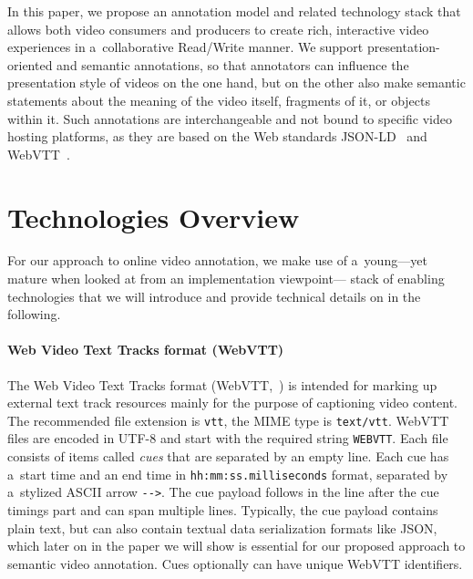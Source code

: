 \documentclass{sig-alternate}
\def\JSONLD{\mbox{JSON-LD}}
\begin{document}
In this paper, we propose an annotation model
and related technology stack that allows both
video consumers and producers to create
rich, interactive video experiences
in a~collaborative Read/Write manner.
We support presentation-oriented and semantic annotations,
so that annotators can influence
the presentation style of videos on the one hand,
but on the other also make semantic statements
about the meaning of the video itself, fragments of it,
or objects within it.
Such annotations are interchangeable
and not bound to specific video hosting platforms,
as they are based on the Web standards
\JSONLD~\cite{sporny2013jsonld}
and WebVTT~\cite{pfeiffer2013webvtt}.

\section{Technologies Overview}

For our approach to online video annotation,
we make use of a~young---yet mature
when looked at from an implementation viewpoint---%
stack of enabling technologies that we will introduce
and provide technical details on in the following.

\paragraph{Web Video Text Tracks format (WebVTT)}

The Web Video Text Tracks format (WebVTT,~\cite{pfeiffer2013webvtt})
is intended for marking up external text track resources mainly
for the purpose of captioning video content.
The recommended file extension is \texttt{vtt},
the MIME type is \texttt{text/vtt}.
WebVTT files are encoded in UTF-8 and
start with the required string \texttt{WEBVTT}.
Each file consists of items called \emph{cues}
that are separated by an empty line.
Each cue has a~start time and an end time in
\texttt{hh:mm:ss.milliseconds} format,
separated by a~stylized ASCII arrow \texttt{-}\texttt{->}.
The cue payload follows in the line after the cue timings part
and can span multiple lines.
Typically, the cue payload contains plain text,
but can also contain textual data serialization formats like JSON,
which later on in the paper we will show is essential
for our proposed approach to semantic video annotation.
Cues optionally can have unique WebVTT identifiers.
\end{document}
